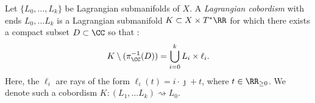 


Let $\{L_0, \ldots, L_k\}$ be Lagrangian submanifolds of $X$. 
A \emph{Lagrangian cobordism} with ends $L_0, \ldots L_k$ is a Lagrangian submanifold $K\subset X\times T^*\RR$ for which there exists a compact subset $D\subset \CC$ so that : 
        \[K\setminus( \pi_\CC^{-1}(D))=\bigcup_{i=0}^k L_i\times \ell_i.\]
    Here, the $\ell_i$ are rays of the form $\ell_i(t)=i\cdot \jmath +t$, where $t\in \RR_{\geq 0}$.
We denote such a cobordism $K:(L_1, \ldots L_k)\rightsquigarrow L_0$. 
\label{def:lagrangianCobordism}

